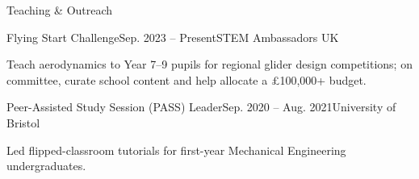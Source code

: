 
\begin{rSection}{Teaching \& Outreach}

    \begin{rSubsection}{Flying Start Challenge}{Sep. 2023 -- Present}{STEM Ambassadors UK}{}
        \item Teach aerodynamics to Year 7--9 pupils for regional glider design competitions; on committee, curate school content and help allocate a £100,000+ budget.
    \end{rSubsection}

    \begin{rSubsection}{Peer-Assisted Study Session (PASS) Leader}{Sep. 2020 -- Aug. 2021}{University of Bristol}{}
        \item Led flipped-classroom tutorials for first-year Mechanical Engineering undergraduates.
    \end{rSubsection}

\end{rSection}
